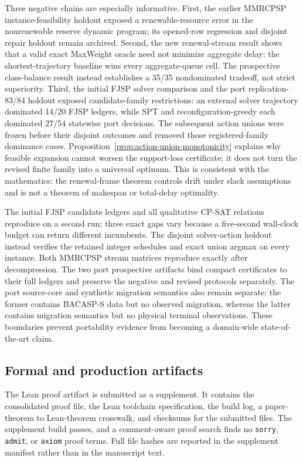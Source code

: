 \documentclass[opre,dblanonrev]{informs4}
\begin{document}
Three negative chains are especially informative.  First, the earlier MMRCPSP
instance-feasibility holdout exposed a renewable-resource error in the
nonrenewable reserve dynamic program; its opened-row regression and disjoint
repair holdout remain archived.  Second, the new renewal-stream result shows
that a valid exact MaxWeight oracle need not minimize aggregate delay: the
shortest-trajectory baseline wins every aggregate-queue cell.  The prospective
class-balance result instead establishes a 35/35 nondominated tradeoff, not
strict superiority.  Third, the initial FJSP solver comparison and the port
replication-83/84 holdout exposed candidate-family restrictions: an external
solver trajectory dominated 14/20 FJSP ledgers, while SPT and
reconfiguration-greedy each dominated 27/54 statewise port decisions.  The
subsequent action unions were frozen before their disjoint outcomes and removed
those registered-family dominance cases.
Proposition~\ref{prop:action-union-monotonicity} explains why feasible expansion
cannot worsen the support-loss certificate; it does not turn the revised finite
family into a universal optimum.  This is consistent with the mathematics: the
renewal-frame theorem controls drift under slack assumptions and is not a
theorem of makespan or total-delay optimality.

The initial FJSP candidate ledgers and all qualitative CP-SAT relations
reproduce on a second run; three exact gaps vary because a five-second
wall-clock budget can return different incumbents.  The disjoint solver-action
holdout instead verifies the retained integer schedules and exact union argmax
on every instance.  Both MMRCPSP stream matrices reproduce exactly after
decompression.  The two port prospective artifacts bind compact certificates
to their full ledgers and preserve the negative and revised protocols
separately.  The port source-core and synthetic migration semantics also remain
separate: the former contains BACASP-S data but no observed migration, whereas
the latter contains migration semantics but no physical terminal observations.
These boundaries prevent portability evidence from becoming a domain-wide
state-of-the-art claim.

\subsection{Formal and production artifacts}
\label{subsec:formal-production}

The Lean proof artifact is submitted as a supplement.  It contains the
consolidated proof file, the Lean toolchain specification, the build log, a
paper-theorem to Lean-theorem crosswalk, and checksums for the submitted files.
The supplement build passes, and a comment-aware proof search finds no
\texttt{sorry}, \texttt{admit}, or \texttt{axiom} proof terms.  Full file hashes
are reported in the supplement manifest rather than in the manuscript text.
\end{document}
